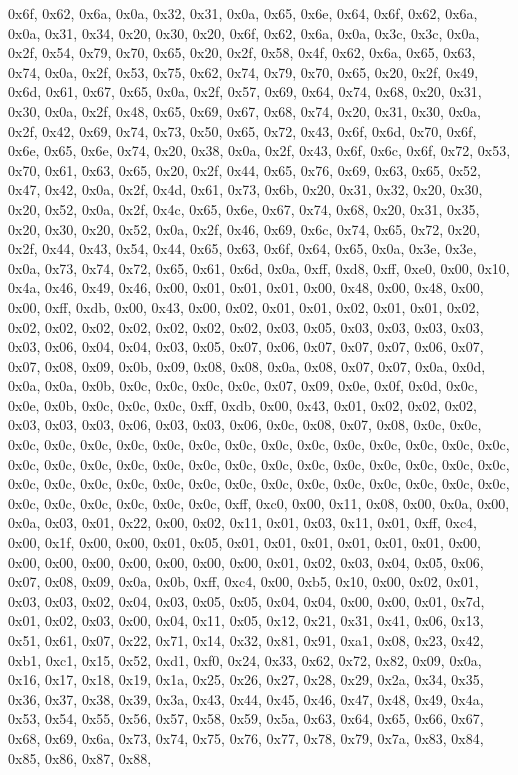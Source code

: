 \documentclass[
]{book}
\begin{document}
0x6f, 0x62, 0x6a, 0x0a, 0x32, 0x31, 0x0a, 0x65, 0x6e, 0x64, 0x6f, 0x62, 0x6a, 0x0a, 0x31, 0x34, 0x20, 0x30, 0x20, 0x6f, 0x62, 0x6a, 0x0a, 0x3c, 0x3c, 0x0a, 0x2f, 0x54, 0x79, 0x70, 0x65, 0x20, 0x2f, 0x58, 0x4f, 0x62, 0x6a, 0x65, 0x63, 0x74, 0x0a, 0x2f, 0x53, 0x75, 0x62, 0x74, 0x79, 0x70, 0x65, 0x20, 0x2f, 0x49, 0x6d, 0x61, 0x67, 0x65, 0x0a, 0x2f, 0x57, 0x69, 0x64, 0x74, 0x68, 0x20, 0x31, 0x30, 0x0a, 0x2f, 0x48, 0x65, 0x69, 0x67, 0x68, 0x74, 0x20, 0x31, 0x30, 0x0a, 0x2f, 0x42, 0x69, 0x74, 0x73, 0x50,
0x65, 0x72, 0x43, 0x6f, 0x6d, 0x70, 0x6f, 0x6e, 0x65, 0x6e, 0x74, 0x20, 0x38, 0x0a, 0x2f, 0x43, 0x6f, 0x6c, 0x6f, 0x72, 0x53, 0x70, 0x61, 0x63, 0x65, 0x20, 0x2f, 0x44, 0x65, 0x76, 0x69, 0x63, 0x65, 0x52, 0x47, 0x42, 0x0a, 0x2f, 0x4d, 0x61, 0x73, 0x6b, 0x20, 0x31, 0x32, 0x20, 0x30, 0x20, 0x52, 0x0a, 0x2f, 0x4c, 0x65, 0x6e, 0x67, 0x74, 0x68, 0x20, 0x31, 0x35, 0x20, 0x30, 0x20, 0x52, 0x0a, 0x2f, 0x46, 0x69, 0x6c, 0x74, 0x65, 0x72, 0x20, 0x2f, 0x44, 0x43, 0x54, 0x44, 0x65, 0x63, 0x6f, 0x64, 0x65, 0x0a,
0x3e, 0x3e, 0x0a, 0x73, 0x74, 0x72, 0x65, 0x61, 0x6d, 0x0a, 0xff, 0xd8, 0xff, 0xe0, 0x00, 0x10, 0x4a, 0x46, 0x49, 0x46, 0x00, 0x01, 0x01, 0x01, 0x00, 0x48, 0x00, 0x48, 0x00, 0x00, 0xff, 0xdb, 0x00, 0x43, 0x00, 0x02, 0x01, 0x01, 0x02, 0x01, 0x01, 0x02, 0x02, 0x02, 0x02, 0x02, 0x02, 0x02, 0x02, 0x03, 0x05, 0x03, 0x03, 0x03, 0x03, 0x03, 0x06, 0x04, 0x04, 0x03, 0x05, 0x07, 0x06, 0x07, 0x07, 0x07, 0x06, 0x07, 0x07, 0x08, 0x09, 0x0b, 0x09, 0x08, 0x08, 0x0a, 0x08, 0x07, 0x07, 0x0a, 0x0d, 0x0a, 0x0a, 0x0b,
0x0c, 0x0c, 0x0c, 0x0c, 0x07, 0x09, 0x0e, 0x0f, 0x0d, 0x0c, 0x0e, 0x0b, 0x0c, 0x0c, 0x0c, 0xff, 0xdb, 0x00, 0x43, 0x01, 0x02, 0x02, 0x02, 0x03, 0x03, 0x03, 0x06, 0x03, 0x03, 0x06, 0x0c, 0x08, 0x07, 0x08, 0x0c, 0x0c, 0x0c, 0x0c, 0x0c, 0x0c, 0x0c, 0x0c, 0x0c, 0x0c, 0x0c, 0x0c, 0x0c, 0x0c, 0x0c, 0x0c, 0x0c, 0x0c, 0x0c, 0x0c, 0x0c, 0x0c, 0x0c, 0x0c, 0x0c, 0x0c, 0x0c, 0x0c, 0x0c, 0x0c, 0x0c, 0x0c, 0x0c, 0x0c, 0x0c, 0x0c, 0x0c, 0x0c, 0x0c, 0x0c, 0x0c, 0x0c, 0x0c, 0x0c, 0x0c, 0x0c, 0x0c, 0x0c, 0x0c, 0x0c,
0xff, 0xc0, 0x00, 0x11, 0x08, 0x00, 0x0a, 0x00, 0x0a, 0x03, 0x01, 0x22, 0x00, 0x02, 0x11, 0x01, 0x03, 0x11, 0x01, 0xff, 0xc4, 0x00, 0x1f, 0x00, 0x00, 0x01, 0x05, 0x01, 0x01, 0x01, 0x01, 0x01, 0x01, 0x00, 0x00, 0x00, 0x00, 0x00, 0x00, 0x00, 0x00, 0x01, 0x02, 0x03, 0x04, 0x05, 0x06, 0x07, 0x08, 0x09, 0x0a, 0x0b, 0xff, 0xc4, 0x00, 0xb5, 0x10, 0x00, 0x02, 0x01, 0x03, 0x03, 0x02, 0x04, 0x03, 0x05, 0x05, 0x04, 0x04, 0x00, 0x00, 0x01, 0x7d, 0x01, 0x02, 0x03, 0x00, 0x04, 0x11, 0x05, 0x12, 0x21, 0x31, 0x41,
0x06, 0x13, 0x51, 0x61, 0x07, 0x22, 0x71, 0x14, 0x32, 0x81, 0x91, 0xa1, 0x08, 0x23, 0x42, 0xb1, 0xc1, 0x15, 0x52, 0xd1, 0xf0, 0x24, 0x33, 0x62, 0x72, 0x82, 0x09, 0x0a, 0x16, 0x17, 0x18, 0x19, 0x1a, 0x25, 0x26, 0x27, 0x28, 0x29, 0x2a, 0x34, 0x35, 0x36, 0x37, 0x38, 0x39, 0x3a, 0x43, 0x44, 0x45, 0x46, 0x47, 0x48, 0x49, 0x4a, 0x53, 0x54, 0x55, 0x56, 0x57, 0x58, 0x59, 0x5a, 0x63, 0x64, 0x65, 0x66, 0x67, 0x68, 0x69, 0x6a, 0x73, 0x74, 0x75, 0x76, 0x77, 0x78, 0x79, 0x7a, 0x83, 0x84, 0x85, 0x86, 0x87, 0x88,
\end{document}
